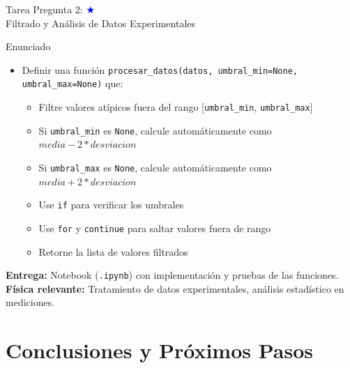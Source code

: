 \documentclass[10pt]{beamer}
\begin{document}
\begin{frame}{Tarea Pregunta 2: \hfill \textcolor{blue}{$\bigstar$} \\ Filtrado y Análisis de Datos Experimentales}
  \begin{block}{Enunciado}
    \begin{itemize}
      \item Definir una función \texttt{procesar\_datos(datos, umbral\_min=None, umbral\_max=None)} que:
        \begin{itemize}
          \item Filtre valores atípicos fuera del rango [\texttt{umbral\_min}, \texttt{umbral\_max}]
          \item Si \texttt{umbral\_min} es \texttt{None}, calcule automáticamente como $media - 2*desviacion$
          \item Si \texttt{umbral\_max} es \texttt{None}, calcule automáticamente como $media + 2*desviacion$
          \item Use \texttt{if} para verificar los umbrales
          \item Use \texttt{for} y \texttt{continue} para saltar valores fuera de rango
          \item Retorne la lista de valores filtrados
        \end{itemize}
    \end{itemize}
  \end{block}
  
  \textbf{Entrega:} Notebook (\texttt{.ipynb}) con implementación y pruebas de las funciones.\\
  \textbf{Física relevante:} Tratamiento de datos experimentales, análisis estadístico en mediciones.
\end{frame}



\fi
\section{Conclusiones y Próximos Pasos}
\end{document}
